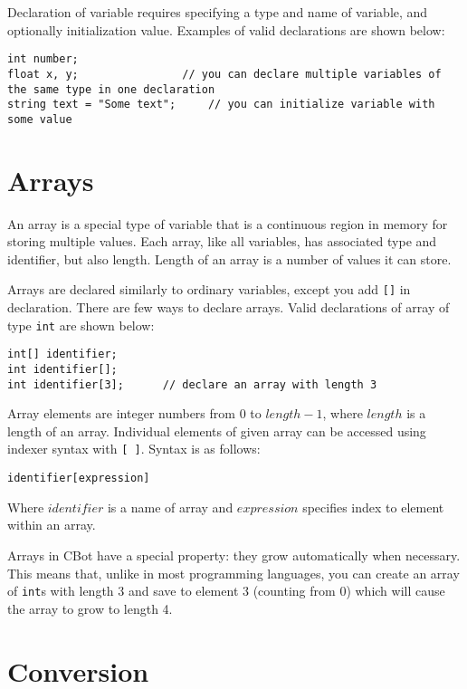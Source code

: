 Declaration of variable requires specifying a type and name of variable, and optionally initialization value. Examples of valid declarations are shown below:

\begin{lstlisting}
int number;
float x, y;                // you can declare multiple variables of the same type in one declaration
string text = "Some text";     // you can initialize variable with some value
\end{lstlisting}


\section{Arrays}
An array is a special type of variable that is a continuous region in memory for storing multiple values. Each array, like all variables, has associated type and identifier, but also length. Length of an array is a number of values it can store.

Arrays are declared similarly to ordinary variables, except you add \texttt{[]} in declaration. There are few ways to declare arrays. Valid declarations of array of type \texttt{int} are shown below:

\begin{lstlisting}
int[] identifier;
int identifier[];
int identifier[3];      // declare an array with length 3
\end{lstlisting}

Array elements are integer numbers from $0$ to $length-1$, where $length$ is a length of an array. Individual elements of given array can be accessed using indexer syntax with \texttt{[ ]}. Syntax is as follows:

\begin{lstlisting}
identifier[expression]
\end{lstlisting}

Where $identifier$ is a name of array and $expression$ specifies index to element within an array.

Arrays in CBot have a special property: they grow automatically when necessary. This means that, unlike in most programming languages, you can create an array of \texttt{int}s with length 3 and save to element $3$ (counting from 0) which will cause the array to grow to length 4.


\section{Conversion}
